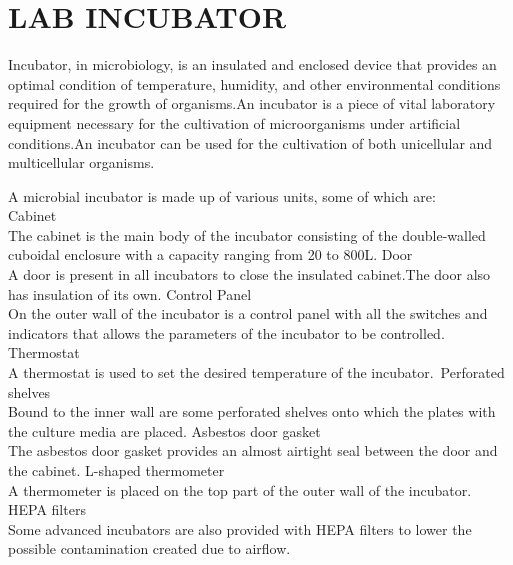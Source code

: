 \documentclass[12pt]{article}
\begin{document}
\newpage

\section{LAB INCUBATOR}

Incubator, in microbiology, is an insulated and enclosed device that provides an optimal condition of temperature, humidity, and other environmental conditions required for the growth of organisms.An incubator is a piece of vital laboratory equipment necessary for the cultivation of microorganisms under artificial conditions.An incubator can be used for the cultivation of both unicellular and multicellular organisms.

\indent

A microbial incubator is made up of various units, some of which are:\\
Cabinet\\
The cabinet is the main body of the incubator consisting of the double-walled cuboidal enclosure with a capacity ranging from 20 to 800L.
Door\\
A door is present in all incubators to close the insulated cabinet.The door also has insulation of its own. 
Control Panel\\
On the outer wall of the incubator is a control panel with all the switches and indicators that allows the parameters of the incubator to be controlled.
Thermostat\\
A thermostat is used to set the desired temperature of the incubator.\
Perforated shelves\\
Bound to the inner wall are some perforated shelves onto which the plates with the culture media are placed.
Asbestos door gasket\\
The asbestos door gasket provides an almost airtight seal between the door and the cabinet.
L-shaped thermometer\\
A thermometer is placed on the top part of the outer wall of the incubator.
HEPA filters\\
Some advanced incubators are also provided with HEPA filters to lower the possible contamination created due to airflow.

\indent
\end{document}
